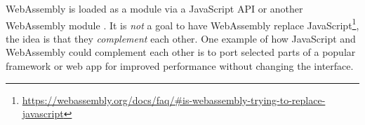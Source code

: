 WebAssembly is loaded as a module via a JavaScript API or another WebAssembly module \parencite{HaasRossbergSchuffTitzerHolmanGohmanWagnerZakaiBastien2017}. It is \emph{not} a goal to have WebAssembly replace JavaScript\footnote{\url{https://webassembly.org/docs/faq/\#is-webassembly-trying-to-replace-javascript}}, the idea is that they \emph{complement} each other. One example of how JavaScript and WebAssembly could complement each other is to port selected parts of a popular framework or web app for improved performance without changing the interface.


